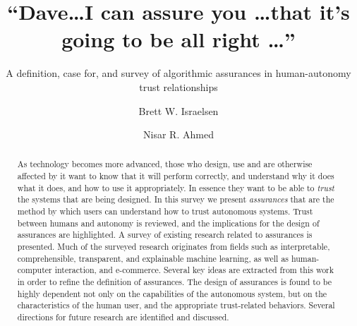 \documentclass[format=acmsmall, screen]{acmart}
\begin{document}
\title{``Dave\ldots I can assure you \ldots that it's going to be all right \ldots''} 
 \subtitle{A definition, case for, and survey of algorithmic assurances in human-autonomy trust relationships}
\author{Brett W. Israelsen}
\author{Nisar R. Ahmed}

\begin{abstract}
    As technology becomes more advanced, those who design, use and are otherwise affected by it want to know that it will perform correctly, and understand why it does what it does, and how to use it appropriately. In essence they want to be able to \emph{trust} the systems that are being designed. In this survey we present \emph{assurances} that are the method by which users can understand how to trust autonomous systems. Trust between humans and autonomy is reviewed, and the implications for the design of assurances are highlighted. A survey of existing research related to assurances is presented. Much of the surveyed research originates from fields such as interpretable, comprehensible, transparent, and explainable machine learning, as well as human-computer interaction, and e-commerce. Several key ideas are extracted from this work in order to refine the definition of assurances. The design of assurances is found to be highly dependent not only on the capabilities of the autonomous system, but on the characteristics of the human user, and the appropriate trust-related behaviors. Several directions for future research are identified and discussed.
\end{abstract}
\end{document}
